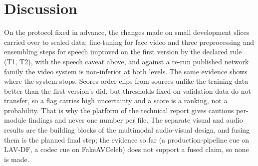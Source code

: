 \documentclass[conference,a4paper]{IEEEtran_nodash}
\begin{document}
\section{Discussion}\label{sec:disc}
On the protocol fixed in advance, the changes made on small development slices
carried over to sealed data: fine-tuning for face video and three preprocessing
and ensembling steps for speech improved on the first version by the declared rule
(T1, T2), with the speech caveat above, and against a re-run published network
family the video system is non-inferior at both levels. The same evidence shows
where the system stops. Scores order clips from sources unlike the training data
better than the first version's did, but thresholds fixed on validation data do
not transfer, so a flag carries high uncertainty and a score is a ranking, not a
probability. That is why the platform of the technical report gives cautious
per-module findings and never one number per file. The separate visual and audio
results are the building blocks of the multimodal audio-visual design, and fusing
them is the planned final step; the evidence so far (a production-pipeline cue on
LAV-DF, a codec cue on FakeAVCeleb) does not support a fused claim, so none is made.

\end{document}
